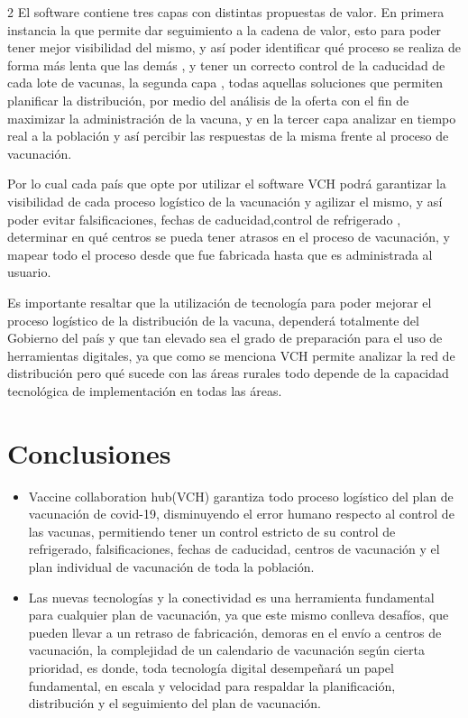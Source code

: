 \documentclass[12pt,spanish,Letterpaper,openany]{book}
\newcommand{\spacethreemilis}{\vspace{3mm}}
\newcommand{\spaceoneminus}{\vspace{-1mm}}
\newcommand{\spacetwominus}{\vspace{-2mm}}
\begin{document}
\begin {multicols}{2}
El software contiene tres capas con distintas propuestas de valor. En primera instancia la que
permite dar seguimiento a la cadena de valor, esto para poder tener mejor visibilidad del
mismo, y así poder identificar qué proceso se realiza de forma más lenta que las demás , y
tener un correcto control de la caducidad de cada lote de vacunas, la segunda capa , todas
aquellas soluciones que permiten planificar la distribución, por medio del análisis de la oferta
con el fin de maximizar la administración de la vacuna, y en la tercer capa analizar en tiempo
real a la población y así percibir las respuestas de la misma frente al proceso de vacunación.

\spacethreemilis

Por lo cual cada país que opte por utilizar el software VCH podrá garantizar la visibilidad de
cada proceso logístico de la vacunación y agilizar el mismo, y así poder evitar falsificaciones,
fechas de caducidad,control de refrigerado , determinar en qué centros se pueda tener atrasos
en el proceso de vacunación, y mapear todo el proceso desde que fue fabricada hasta que es
administrada al usuario.

\spacethreemilis

Es importante resaltar que la utilización de tecnología para poder mejorar el proceso logístico
de la distribución de la vacuna, dependerá totalmente del Gobierno del país y que tan elevado
sea el grado de preparación para el uso de herramientas digitales, ya que como se menciona
VCH permite analizar la red de distribución pero qué sucede con las áreas rurales todo
depende de la capacidad tecnológica de implementación en todas las áreas.

\hypertarget{conclusiones-1}{%
\section{Conclusiones}\label{conclusiones-1}}

\spacetwominus
\spaceoneminus

\begin{itemize}
\item
  Vaccine collaboration hub(VCH) garantiza todo proceso logístico del plan de
  vacunación de covid-19, disminuyendo el error humano respecto al control de las
  vacunas, permitiendo tener un control estricto de su control de refrigerado,
  falsificaciones, fechas de caducidad, centros de vacunación y el plan individual de
  vacunación de toda la población.
\item
  Las nuevas tecnologías y la conectividad es una herramienta fundamental para
  cualquier plan de vacunación, ya que este mismo conlleva desafíos, que pueden
  llevar a un retraso de fabricación, demoras en el envío a centros de vacunación, la
  complejidad de un calendario de vacunación según cierta prioridad, es donde, toda
  tecnología digital desempeñará un papel fundamental, en escala y velocidad para
  respaldar la planificación, distribución y el seguimiento del plan de vacunación.
\end{itemize}


\end{multicols}
\end{document}
